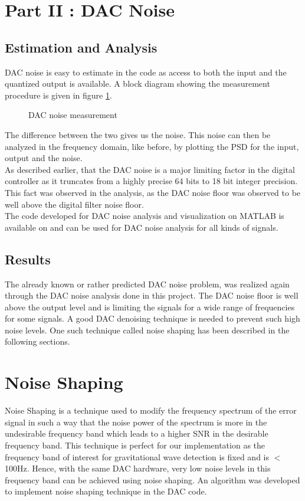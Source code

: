 \documentclass[colorlinks=true,pdfstartview=FitV,linkcolor=blue,
            citecolor=red,urlcolor=magenta]{ligodoc}
\begin{document}
\section{Part II : DAC Noise}
\label{dac}
	\subsection{Estimation and Analysis}
		DAC noise is easy to estimate in the code as access to both the input and the quantized output is available. A block diagram showing the measurement procedure is given in figure \ref{mea}.
		\begin{figure}[H]
  		\centering
  		\def\svgscale{0.5}
  		\tiny{
  		
  		}
  		\caption{DAC noise measurement}
		\label{mea}
		\end{figure}
		The difference between the two gives us the noise. This noise can then be analyzed in the frequency domain, like before, by plotting the PSD for the input, output and the noise. \\As described earlier, that the DAC noise is a major limiting factor in the digital controller as it truncates from a highly precise 64 bits to 18 bit integer precision. This fact was observed in the analysis, as the DAC noise floor was observed to be well above the digital filter noise floor. 
		\\The code developed for DAC noise analysis and visualization on MATLAB is available on \cite{Git} and can be used for DAC noise analysis for all kinds of signals. 
    \subsection{Results}
    The already known or rather predicted DAC noise problem, was realized again through the DAC noise analysis done in this project. The DAC noise floor is well above the output level and is limiting the signals for a wide range of frequencies for some signals. A good DAC denoising technique is needed to prevent such high noise levels. One such technique called noise shaping has been described in the following sections.
\section{Noise Shaping}
\label{dacdenoising}
	Noise Shaping is a technique used to modify the frequency spectrum of the error signal in such a way that the noise power of the spectrum is more in the undesirable frequency band which leads to a higher SNR in the desirable frequency band. This technique is perfect for our implementation as the frequency band of interest for gravitational wave detection is fixed and is $<$ 100Hz. Hence, with the same DAC hardware, very low noise levels in this frequency band can be achieved using noise shaping. An algorithm was developed to implement noise shaping technique in the DAC code. 
\end{document}

